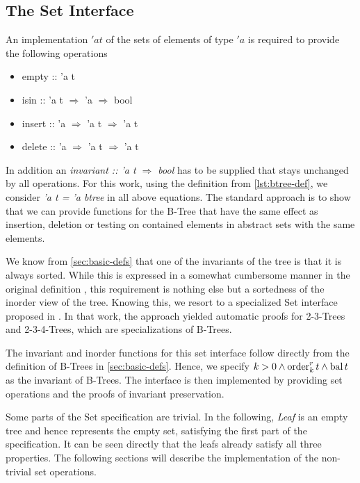 \subsection{The Set Interface}

An implementation $'a t$ of the sets of elements of type $'a$ is required to provide the following
operations

\begin{itemize}
    \itshape
    \item empty :: 'a t
    \item isin :: 'a t $\Rightarrow$ 'a $\Rightarrow$ bool
    \item insert :: 'a $\Rightarrow$ 'a t $\Rightarrow$ 'a t
    \item delete :: 'a $\Rightarrow$ 'a t $\Rightarrow$ 'a t
\end{itemize}

In addition an \textit{invariant :: 'a t $\Rightarrow$ bool} has to be supplied
that stays unchanged by all operations.
For this work, using the definition from \autoref{lst:btree-def},
we consider \textit{'a t = 'a btree} in all above equations.
The standard approach is to show that we can provide functions for the B-Tree
that have the same effect as insertion, deletion or testing on contained elements
in abstract sets with the same elements.

We know from \autoref{sec:basic-defs} that one of the invariants
of the tree is that it is always sorted.
While this is expressed in a somewhat cumbersome manner
in the original definition \parencite{DBLP:journals/acta/BayerM72},
this requirement is nothing else but a sortedness of the inorder view of the tree.
Knowing this, we resort to a specialized Set interface
proposed in \parencite{DBLP:conf/itp/Nipkow16}.
In that work, the approach yielded automatic proofs for 2-3-Trees
and 2-3-4-Trees, which are specializations of B-Trees.

The invariant and inorder functions for this set interface
follow directly from the definition of B-Trees in \autoref{sec:basic-defs}.
Hence, we specify $k > 0 \wedge \operatorname{order}^r_k t \wedge \operatorname{bal} t$
as the invariant of B-Trees.
The interface is then implemented by providing set operations
and the proofs of invariant preservation.

Some parts of the Set specification are trivial.
In the following, \textit{Leaf} is an empty tree and hence represents
the empty set, satisfying the first part of the specification.
It can be seen directly that the leafs already satisfy all three properties.
The following sections will describe the implementation of the
non-trivial set operations.

